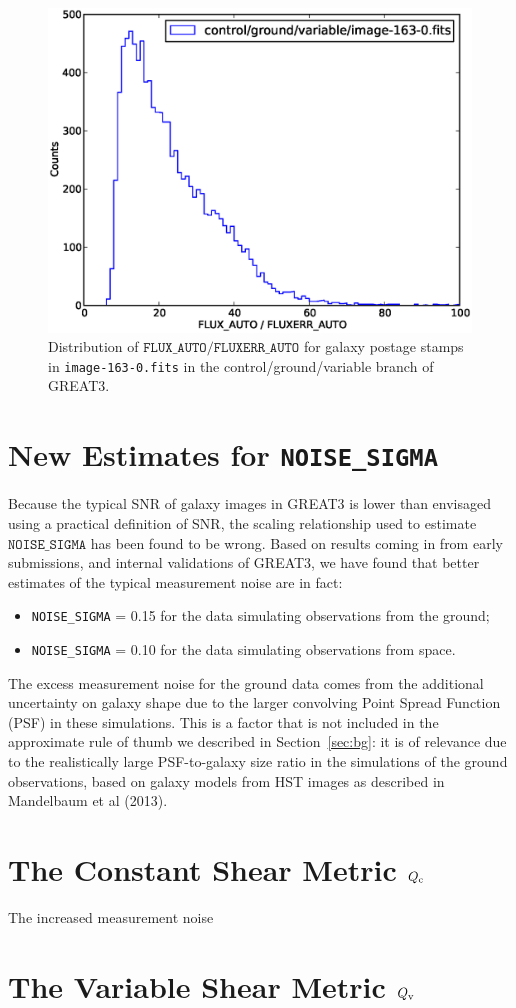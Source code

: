 \documentclass[preprint,11pt]{aastex}
\begin{document}
\begin{figure}\label{eq:snr}
\begin{center}
\includegraphics[width=\textwidth]{snr_cvg.eps}
\caption{Distribution of $\texttt{FLUX\_AUTO} /
  \texttt{FLUXERR\_AUTO}$ for galaxy postage stamps in
  \texttt{image-163-0.fits} in the control/ground/variable branch of GREAT3.}
\end{center}
\end{figure}

\section{New Estimates for \texttt{NOISE\_SIGMA}}
Because the typical SNR of galaxy images in GREAT3 is lower than
envisaged using a practical definition of SNR, the scaling
relationship used to estimate $\texttt{NOISE\_SIGMA}$ has been found
to be wrong.   Based on results coming in from early submissions, and
internal validations of GREAT3, we have found that better estimates of
the typical measurement noise are in fact:
\begin{itemize}
\item[] \texttt{NOISE\_SIGMA} = 0.15 for the data simulating
  observations from the ground;
\item[] \texttt{NOISE\_SIGMA} = 0.10 for the data simulating
  observations from space.
\end{itemize}
The excess measurement noise for the ground data comes from the
additional uncertainty on galaxy shape due to the larger convolving
Point Spread Function (PSF) in these simulations.  This is a factor
that is not included in the approximate rule of thumb we described in
Section~\ref{sec:bg}: it is of relevance due to the realistically
large PSF-to-galaxy size ratio in the simulations of the ground
observations, based on galaxy models from HST images as described in
Mandelbaum et al (2013).

\section{The Constant Shear Metric $Q_{\rm c}$}\label{sec:qc}
The increased measurement noise 

\section{The Variable Shear Metric $Q_{\rm v}$}\label{sec:qv}
\end{document}
